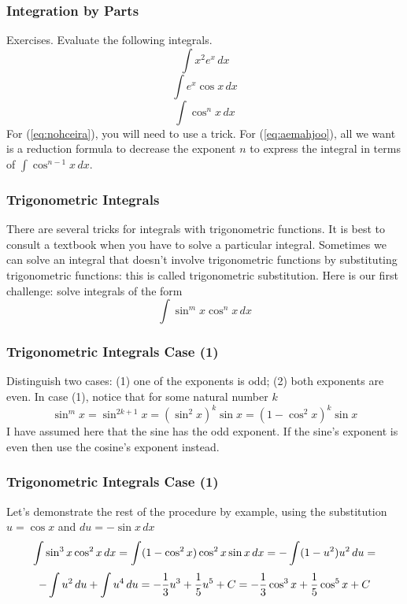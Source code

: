 \documentclass[xcolor=dvipsnames]{beamer}
\begin{document}
\begin{frame}
  \frametitle{Integration by Parts}
  Exercises. Evaluate the following integrals.
  \begin{equation}
    \label{eq:oizaixea}
    \int{}x^{2}e^{x}\,dx
  \end{equation}
  \begin{equation}
    \label{eq:nohceira}
    \int{}e^{x}\cos{}x\,dx
  \end{equation}
  \begin{equation}
    \label{eq:aemahjoo}
    \int\cos^{n}x\,dx
  \end{equation}
  For (\ref{eq:nohceira}), you will need to use a trick. For
  (\ref{eq:aemahjoo}), all we want is a \alert{reduction formula} to
  decrease the exponent $n$ to express the integral in terms of
  $\int\cos^{n-1}x\,dx$.
\end{frame}

\begin{frame}
  \frametitle{Trigonometric Integrals}
  There are several tricks for integrals with trigonometric functions.
  It is best to consult a textbook when you have to solve a particular
  integral. Sometimes we can solve an integral that doesn't involve
  trigonometric functions by substituting trigonometric functions:
  this is called trigonometric substitution. Here is our first
  challenge: solve integrals of the form
  \begin{equation}
    \label{eq:iepheith}
    \int\sin^{m}x\cos^{n}x\,dx
  \end{equation}
\end{frame}

\begin{frame}
  \frametitle{Trigonometric Integrals Case (1)}
  Distinguish two cases: (1) one of the exponents is odd; (2) both
  exponents are even. In case (1), notice that for
  some natural number $k$
  \begin{equation}
    \label{eq:oghufohx}
    \sin^{m}x=\sin^{2k+1}x=(\sin^{2}x)^{k}\sin{}x=(1-\cos^{2}x)^{k}\sin{}x
  \end{equation}
  I have assumed here that the sine has the odd exponent. If the
  sine's exponent is even then use the cosine's exponent instead.
\end{frame}

\begin{frame}
  \frametitle{Trigonometric Integrals Case (1)}
  Let's demonstrate the rest of the procedure by example, using the
  substitution $u=\cos{}x$ and $du=-\sin{}x\,dx$
\begin{equation}
  \label{eq:zephulai}
  \int\sin^{3}x\cos^{2}x\,dx=\int(1-\cos^{2}x)\cos^{2}x\sin{}x\,dx=-\int(1-u^{2})u^{2}\,du=\notag
\end{equation}
\begin{equation}
  \label{eq:joochupa}
  -\int{}u^{2}\,du+\int{}u^{4}\,du=-\frac{1}{3}u^{3}+\frac{1}{5}u^{5}+C=-\frac{1}{3}\cos^{3}x+\frac{1}{5}\cos^{5}x+C\notag
\end{equation}
\end{frame}
\end{document}
